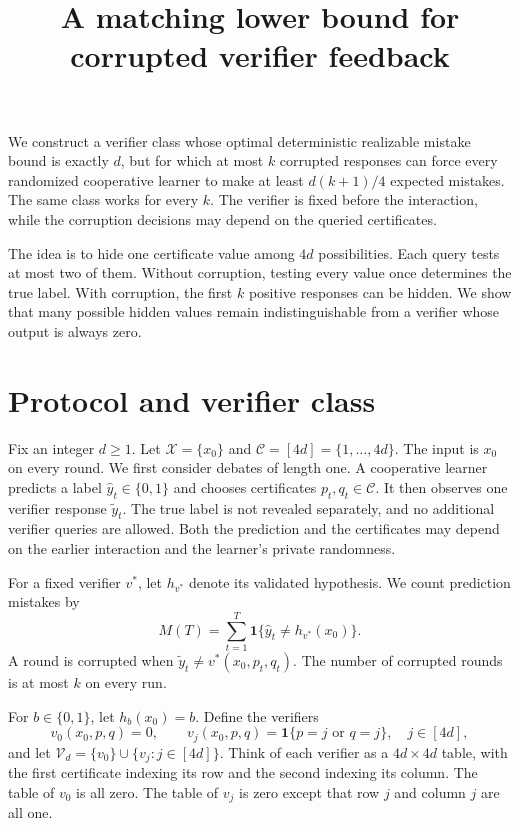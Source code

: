 \documentclass[11pt]{article}
\title{A matching lower bound for corrupted verifier feedback}
\author{}
\date{}
\newcommand{\X}{\mathcal X}
\newcommand{\C}{\mathcal C}
\newcommand{\V}{\mathcal V}
\newcommand{\ind}{\mathbf 1}
\begin{document}
\maketitle

We construct a verifier class whose optimal deterministic realizable mistake
bound is exactly $d$, but for which at most $k$ corrupted responses can force
every randomized cooperative learner to make at least $d(k+1)/4$ expected
mistakes. The same class works for every $k$. The verifier is fixed before
the interaction, while the corruption decisions may depend on the queried
certificates.

The idea is to hide one certificate value among $4d$ possibilities. Each
query tests at most two of them. Without corruption, testing every value
once determines the true label. With corruption, the first $k$ positive
responses can be hidden. We show that many possible hidden values remain
indistinguishable from a verifier whose output is always zero.

\section{Protocol and verifier class}\label{sec:class}

Fix an integer $d\ge1$. Let $\X=\{x_0\}$ and $\C=[4d]=\{1,\ldots,4d\}$.
The input is $x_0$ on every round. We first consider debates of length one.
A cooperative learner predicts a label $\hat y_t\in\{0,1\}$ and chooses
certificates $p_t,q_t\in\C$. It then observes one verifier response
$\tilde y_t$. The true label is not revealed separately, and no additional
verifier queries are allowed. Both the prediction and the certificates may
depend on the earlier interaction and the learner's private randomness.

For a fixed verifier $v^*$, let $h_{v^*}$ denote its validated hypothesis.
We count prediction mistakes by
\[
M(T)=\sum_{t=1}^T\ind\{\hat y_t\ne h_{v^*}(x_0)\}.
\]
A round is corrupted when $\tilde y_t\ne v^*(x_0,p_t,q_t)$. The number of
corrupted rounds is at most $k$ on every run.

For $b\in\{0,1\}$, let $h_b(x_0)=b$. Define the verifiers
\[
v_0(x_0,p,q)=0,
\qquad
v_j(x_0,p,q)=\ind\{p=j\text{ or }q=j\},\quad j\in[4d],
\]
and let $\V_d=\{v_0\}\cup\{v_j:j\in[4d]\}$.
Think of each verifier as a $4d\times4d$ table, with the first certificate
indexing its row and the second indexing its column. The table of $v_0$ is
all zero. The table of $v_j$ is zero except that row $j$ and column $j$ are
all one.
\end{document}
